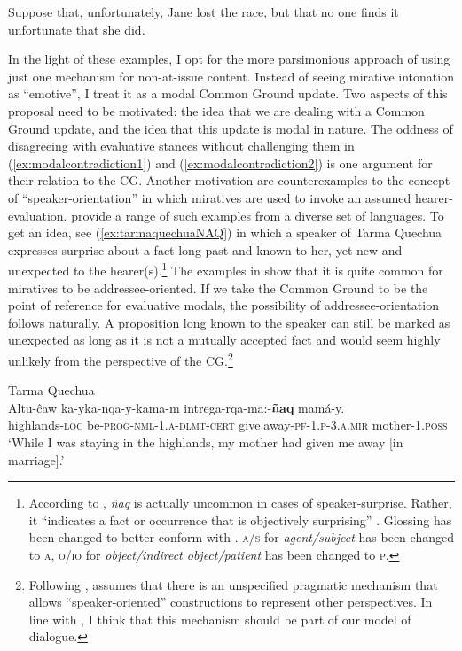 \ea\label{ex:mooreansentenceunfortunatelyNOONE} 
	Suppose that, unfortunately, Jane lost the race, but that no one finds it unfortunate that she did.
\z

In the light of these examples, I opt for the more parsimonious approach of using just one mechanism for non-at-issue content. Instead of seeing mirative intonation as ``emotive'', I treat it as a modal Common Ground update. Two aspects of this proposal need to be motivated: the idea that we are dealing with a Common Ground update, and the idea that this update is modal in nature. The oddness of disagreeing with evaluative stances without challenging them in (\ref{ex:modalcontradiction1}) and (\ref{ex:modalcontradiction2}) is one argument for their relation to the \ac{CG}. Another motivation are counterexamples to the concept of ``speaker-orientation'' in which miratives are used to invoke an assumed hearer-evaluation. \citet{HengeveldOlbertz.2012} provide a range of such examples from a diverse set of languages. To get an idea, see (\ref{ex:tarmaquechuaNAQ}) in which a speaker of Tarma Quechua expresses surprise about a fact long past and known to her, yet new and unexpected to the hearer(s).\footnote{According to \citet{Adelaar.2013}, \textit{ñaq} is actually uncommon in cases of speaker-surprise. Rather, it ``indicates a fact or occurrence that is objectively surprising'' \citep[99]{Adelaar.2013}. Glossing has been changed to better conform with \citet{ComrieHaspelmathBickel.2008leipziglgossing}. \textsc{a/s} for \textit{agent/subject} has been changed to \textsc{a}, \textsc{o/io} for \textit{object/indirect object/patient} has been changed to \textsc{p}.} The examples in \citet{HengeveldOlbertz.2012} show that it is quite common for miratives to be addressee-oriented. If we take the Common Ground to be the point of reference for evaluative modals, the possibility of addressee-orientation follows naturally. A proposition long known to the speaker can still be marked as unexpected as long as it is not a mutually accepted fact and would seem highly unlikely from the perspective of the \ac{CG}.\footnote{Following \citet{HarrisPotts.2009}, \citet[308]{Rett.2021emotivemarkers} assumes that there is an unspecified pragmatic mechanism that allows ``speaker-oriented'' constructions to represent other perspectives. In line with \citet[733--739]{AmaralRobertsSmith.2007}, I think that this mechanism should be part of our model of dialogue.}

\begin{exe} 
	\ex \label{ex:tarmaquechuaNAQ} Tarma Quechua \citep[491]{HengeveldOlbertz.2012}\\
		\gll Altu-ĉaw ka-yka-nqa-y-kama-m intrega-rqa-ma:-\textbf{ñaq} mamá-y.  \\
			 highlands-\textsc{loc} be-\textsc{prog-nml-1.a-dlmt-cert} give.away-\textsc{pf-1.p-3.a.mir} mother-\textsc{1.poss} \\
		\glt `While I was staying in the highlands, my mother had given me away [in marriage].'
\end{exe}

